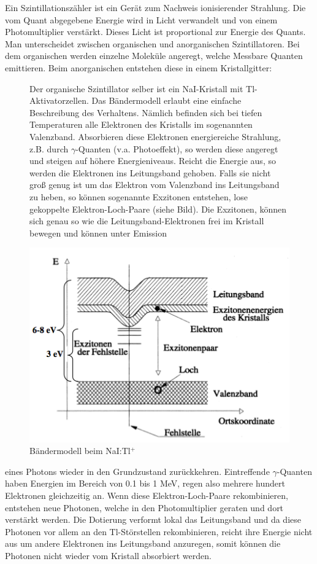 Ein Szintillationszähler ist ein Gerät zum Nachweis ionisierender Strahlung. Die vom Quant abgegebene Energie wird in Licht verwandelt und von einem Photomultiplier verstärkt. Dieses Licht ist proportional zur Energie des Quants. Man unterscheidet zwischen organischen und anorganischen Szintillatoren. Bei dem organischen werden einzelne Moleküle angeregt, welche Messbare Quanten emittieren. Beim anorganischen entstehen diese in einem Kristallgitter:

\begin{figure}[H]
	\begin{minipage}{0.45\textwidth}
	Der organische Szintillator selber ist ein NaI-Kristall mit Tl-Aktivatorzellen. Das Bändermodell erlaubt eine einfache Beschreibung des Verhaltens. Nämlich befinden sich bei tiefen Temperaturen alle Elektronen des Kristalls im sogenannten Valenzband. Absorbieren diese Elektronen energiereiche Strahlung, z.B. durch $\gamma$-Quanten (v.a. Photoeffekt), so werden diese angeregt und steigen auf höhere Energieniveaus. Reicht die Energie aus, so werden die Elektronen ins Leitungsband gehoben. Falls sie nicht groß genug ist um das Elektron vom Valenzband ins Leitungsband zu heben, so können sogenannte Exzitonen entstehen, lose gekoppelte Elektron-Loch-Paare (siehe Bild). Die Exzitonen, können sich genau so wie die Leitungsband-Elektronen frei im Kristall bewegen und können unter Emission 
	\end{minipage}
	\begin{minipage}{0.55\textwidth}
	\centering \includegraphics[width=\textwidth]{Bilder/Bandmodell.png}
	\caption{Bändermodell beim NaI:Tl$^+$}
	\end{minipage}
\end{figure}
eines Photons wieder in den Grundzustand zurückkehren. Eintreffende $\gamma$-Quanten haben Energien im Bereich von 0.1 bis 1 MeV, regen also mehrere hundert Elektronen gleichzeitig an. Wenn diese Elektron-Loch-Paare rekombinieren, entstehen neue Photonen, welche in den Photomultiplier geraten und dort verstärkt werden. Die Dotierung verformt lokal das Leitungsband und da diese Photonen vor allem an den Tl-Störstellen rekombinieren, reicht ihre Energie nicht aus um andere Elektronen ins Leitungsband anzuregen, somit können die Photonen nicht wieder vom Kristall absorbiert werden.

